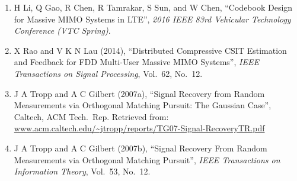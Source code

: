 \begin{enumerate}
\item H Li, Q Gao, R Chen, R Tamrakar, S Sun, and W Chen, ``Codebook Design for Massive MIMO Systems in LTE'', \textit{2016 IEEE 83rd Vehicular Technology Conference (VTC Spring)}.

\item X Rao and V K N Lau (2014), ``Distributed Compressive CSIT Estimation and Feedback for FDD Multi-User Massive MIMO Systems'', \textit{IEEE Transactions on Signal Processing}, Vol.\ 62, No.\ 12.

\item J A Tropp and A C Gilbert (2007a), ``Signal Recovery from Random Measurements via Orthogonal Matching Pursuit: The Gaussian Case'', Caltech, ACM Tech.\ Rep. Retrieved from: \url{www.acm.caltech.edu/~jtropp/reports/TG07-Signal-RecoveryTR.pdf}

\item J A Tropp and A C Gilbert (2007b), ``Signal Recovery From Random Measurements via Orthogonal Matching Pursuit'', \textit{IEEE Transactions on Information Theory}, Vol.\ 53, No.\ 12.


\end{enumerate}
